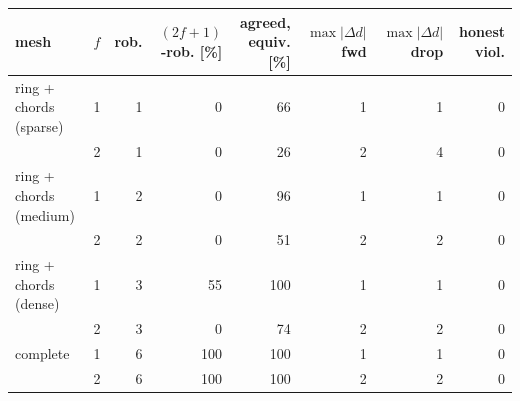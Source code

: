 \begin{tabular}{@{}lrrrrrrr@{}}
\toprule
mesh & $f$ & rob. & $(2f{+}1)$-rob. [\%] & agreed, equiv. [\%] & $\max|\Delta d|$ fwd & $\max|\Delta d|$ drop & honest viol.\\
\midrule
ring + chords (sparse) & 1 & 1 & 0 & 66 & 1 & 1 & 0 \\
 & 2 & 1 & 0 & 26 & 2 & 4 & 0 \\
ring + chords (medium) & 1 & 2 & 0 & 96 & 1 & 1 & 0 \\
 & 2 & 2 & 0 & 51 & 2 & 2 & 0 \\
ring + chords (dense) & 1 & 3 & 55 & 100 & 1 & 1 & 0 \\
 & 2 & 3 & 0 & 74 & 2 & 2 & 0 \\
complete & 1 & 6 & 100 & 100 & 1 & 1 & 0 \\
 & 2 & 6 & 100 & 100 & 2 & 2 & 0 \\
\bottomrule
\end{tabular}
